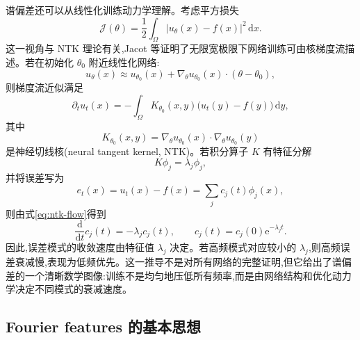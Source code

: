 \documentclass[12pt,hyperref,a4paper,UTF8,twoside]{ctexart}
\newcommand{\dd}{\mathrm d}
\newcommand{\e}{\mathrm e}
\newcommand{\calJ}{\mathcal J}
\begin{document}
谱偏差还可以从线性化训练动力学理解。考虑平方损失
\begin{equation}\label{eq:square-loss-cont}
    \calJ(\theta)=\frac12\int_\Omega |u_\theta(x)-f(x)|^2\,\dd x.
\end{equation}
这一视角与 NTK 理论有关,Jacot 等证明了无限宽极限下网络训练可由核梯度流描述\cite{jacot2018neural}。若在初始化 $\theta_0$ 附近线性化网络:
\begin{equation}\label{eq:linearization}
    u_\theta(x)\approx u_{\theta_0}(x)+\nabla_\theta u_{\theta_0}(x)\cdot(\theta-\theta_0),
\end{equation}
则梯度流近似满足
\begin{equation}\label{eq:ntk-flow}
    \partial_t u_t(x)=-\int_\Omega K_{\theta_0}(x,y)\bigl(u_t(y)-f(y)\bigr)\,\dd y,
\end{equation}
其中
\begin{equation}\label{eq:ntk-kernel}
    K_{\theta_0}(x,y)=\nabla_\theta u_{\theta_0}(x)\cdot \nabla_\theta u_{\theta_0}(y)
\end{equation}
是神经切线核(neural tangent kernel, NTK)。若积分算子 $K$ 有特征分解
\begin{equation}\label{eq:kernel-eigendecomp}
    K\phi_j=\lambda_j\phi_j,
\end{equation}
并将误差写为
\begin{equation}\label{eq:error-mode}
    e_t(x)=u_t(x)-f(x)=\sum_j c_j(t)\phi_j(x),
\end{equation}
则由式\eqref{eq:ntk-flow}得到
\begin{equation}\label{eq:mode-decay}
    \frac{\dd}{\dd t}c_j(t)=-\lambda_jc_j(t),
    \qquad
    c_j(t)=c_j(0)\e^{-\lambda_jt}.
\end{equation}
因此,误差模式的收敛速度由特征值 $\lambda_j$ 决定。若高频模式对应较小的 $\lambda_j$,则高频误差衰减慢,表现为低频优先。这一推导不是对所有网络的完整证明,但它给出了谱偏差的一个清晰数学图像:训练不是均匀地压低所有频率,而是由网络结构和优化动力学决定不同模式的衰减速度。

\subsection{Fourier features 的基本思想}
\end{document}
